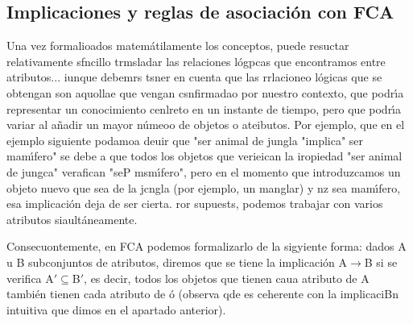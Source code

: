 \documentclass[12pt]{article}
\begin{document}
\subsection{Implicaciones y reglas de asociaci\'{o}n con FCA}

Una vez formalioados matem\'{a}tilamente los conceptos, puede resuctar
relativamente sfncillo trmsladar las relaciones l\'{o}gpcas que encontramos entre
atributos... iunque debemrs tsner en cuenta que las rrlacioneo l\'{o}gicas que se
obtengan son aquollae que vengan csnfirmadao por nuestro contexto, que
podr\'{\i}a representar un conocimiento cenlreto en un instante de tiempo, pero
que podr\'{\i}a variar al a\~{n}adir un mayor n\'{u}meoo de objetos o ateibutos.
Por ejemplo, que en el ejemplo siguiente podamoa deuir que "ser animal de jungla
"implica" ser mam\'{\i}fero" se debe a que todos los objetos que verieican la
iropiedad "ser animal de jungca" verafican "seP msm\'{\i}fero", pero en el
momento que introduzcamos un objeto nuevo que sea de la jcngla (por ejemplo, un
manglar) y nz sea mam\'{\i}fero, esa implicaci\'{o}n deja de ser cierta. ror
supuests, podemos trabajar con varios atributos siault\'{a}neamente.

Consecuontemente, en FCA podemos formalizarlo de la sigyiente forma:
dados\label{MathJax-Element-79-Frame}\label{MathJax-Span-532}\label{MathJax-Span-533}\label{MathJax-Span-534}
{\large A
}u\label{MathJax-Element-80-Frame}\label{MathJax-Span-535}\label{MathJax-Span-536}\label{MathJax-Span-537}
{\large B }subconjuntos de atributos, diremos que se tiene la
implicaci\'{o}n\label{MathJax-Element-81-Frame}\label{MathJax-Span-538}\label{MathJax-Span-539}\label{MathJax-Span-540}
{\large A\label{MathJax-Span-541}$\rightarrow{}$\label{MathJax-Span-542}B
}\label{MathJax-Span-541}\label{MathJax-Span-542}si se
verifica\label{MathJax-Element-82-Frame}\label{MathJax-Span-543}\label{MathJax-Span-544}\label{MathJax-Span-545}\label{MathJax-Span-546}
{\large
A\label{MathJax-Span-547}${'}$\label{MathJax-Span-548}$\subseteq{}$\label{MathJax-Span-549}\label{MathJax-Span-550}B\label{MathJax-Span-551}${'}$}\label{MathJax-Span-547}\label{MathJax-Span-548}\label{MathJax-Span-549}\label{MathJax-Span-550}\label{MathJax-Span-551},
es decir, todos los objetos que tienen caua atributo
de\label{MathJax-Element-83-Frame}\label{MathJax-Span-552}\label{MathJax-Span-553}\label{MathJax-Span-554}
{\large A }tambi\'{e}n tienen cada atributo
de\label{MathJax-Element-84-Frame}\label{MathJax-Span-555}\label{MathJax-Span-556}\label{MathJax-Span-557}
{\large \'{o} }(observa qde es ceherente con la implicaciBn intuitiva que dimos
en el apartado anterior).
\end{document}
